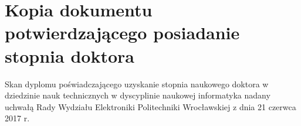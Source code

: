 \documentclass[nohyper,nobib,a4paper]{tufte-book}
\begin{document}
\frontmatter

\mainmatter







	
\chapter{Kopia dokumentu potwierdzającego posiadanie stopnia doktora}

\noindent Skan dyplomu poświadczającego uzyskanie stopnia naukowego doktora w dziedzinie nauk technicznych w dyscyplinie naukowej informatyka nadany uchwałą Rady Wydziału Elektroniki Politechniki Wrocławskiej z dnia 21 czerwca 2017 r.
\thispagestyle{empty}


\thispagestyle{empty}









\backmatter

%
%

%
%

\end{document}
